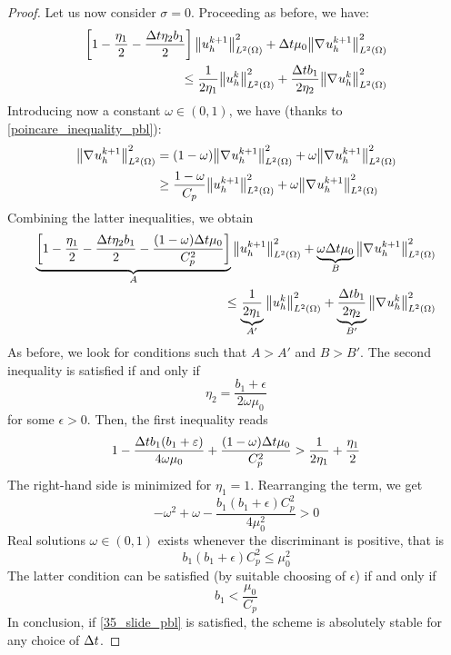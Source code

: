 \begin{proof}
    Let us now consider \(\sigma= 0\). Proceeding as before, we have: 
    \begin{equation*}
        \begin{split}
            \left[ 1-\frac{\eta_1}{2} - \frac{\Delta t \eta_2 b_1}{2} \right] \norm{u_h^{k+1}}_{L^2(\Omega)}^2 + \Delta t \mu_0 \norm{\nabla\mspace{1mu} u_h^{k+1}}_{L^2(\Omega)}^2 \\ 
            \leq \frac{1}{2\eta_1} \norm{u_h^{k}}_{L^2(\Omega)}^2 + \frac{\Delta t b_1}{2 \eta_2} \norm{\nabla\mspace{1mu} u_h^{k}}_{L^2(\Omega)}^2
        \end{split}
    \end{equation*}
    Introducing now a constant \(\omega \in (0,1)\), we have (thanks to \eqref{poincare_inequality_pbl}):
    \begin{equation*}
        \begin{aligned}
            \norm{\nabla\mspace{1mu} u_h^{k+1}}_{L^2(\Omega)}^2 &= (1-\omega) \norm{\nabla\mspace{1mu} u_h^{k+1}}_{L^2(\Omega)}^2 + \omega \norm{ \nabla\mspace{1mu} u_h^{k+1}}_{L^2(\Omega)}^2 \\
            &\geq \frac{1-\omega}{C_p} \norm{u_h^{k+1}}_{L^2(\Omega)}^2 + \omega \norm{\nabla\mspace{1mu} u_h^{k+1}}_{L^2(\Omega)}^2
        \end{aligned}
    \end{equation*}
    Combining the latter inequalities, we obtain 
    \begin{equation*}
        \begin{split}
            \underbrace{\left[ 1 - \frac{\eta_1}{2} - \frac{\Delta t \eta_2 b_1}{2} - \frac{(1-\omega)\Delta t \mu_0}{C_p^2}\right]}_{A} \norm{u_h^{k+1}}_{L^2(\Omega)}^2 + \underbrace{\omega \Delta t \mu_0}_{B} \norm{\nabla\mspace{1mu} u_h^{k+1}}_{L^2(\Omega)}^2 \\
            \leq \underbrace{\frac{1}{2\eta_1}}_{A'} \norm{u_h^{k}}_{L^2(\Omega)}^2 + \underbrace{\frac{\Delta t b_1}{2 \eta_2}}_{B'} \norm{\nabla\mspace{1mu} u_h^{k}}_{L^2(\Omega)}^2 
        \end{split}
    \end{equation*}
    As before, we look for conditions such that \(A >A'\) and \(B>B'\). The second inequality is satisfied if and only if
    \[
        \eta_2 =\frac{b_1 + \epsilon}{2\omega \mu_0}
    \]
    for some \(\epsilon > 0\).
    Then, the first inequality reads
    \[
        1 - \frac{\Delta t b_1 (b_1 + \varepsilon)}{4\omega \mu_0} + \frac{(1-\omega) \Delta t \mu_0}{C^2_p} > \frac{1}{2\eta_1} + \frac{\eta_1}{2}
    \]
    The right-hand side is minimized for \(\eta_1 = 1\). Rearranging the term, we get 
    \begin{equation}
        -\omega^2 + \omega -\frac{b_1(b_1 +\epsilon)C_p^2}{4\mu_0^2} > 0
        \label{34_slide_pbl}
    \end{equation}
    Real solutions \(\omega \in (0,1)\) exists whenever the discriminant is positive, that is 
    \[
        b_1(b_1+\epsilon)C_p^2 \leq \mu_0^2
    \]
    The latter condition can be satisfied (by suitable choosing of \(\epsilon\)) if and only if 
    \begin{equation}
        b_1 < \frac{\mu_0}{C_p}
        \label{35_slide_pbl}
    \end{equation}
    In conclusion, if \eqref{35_slide_pbl} is satisfied, the scheme is absolutely stable for any choice of \(\Delta t\).
\end{proof}